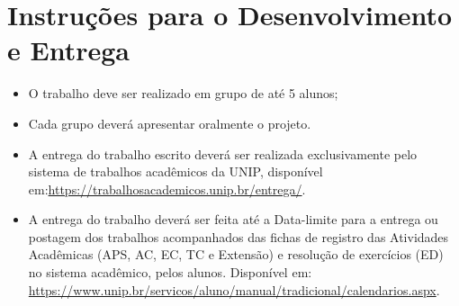 \chapter*{Instruções para o Desenvolvimento e Entrega}
\begin{itemize}
    \item O trabalho deve ser realizado em grupo de até 5 alunos;
    \item Cada grupo deverá apresentar oralmente o projeto.
    \item A entrega do trabalho escrito deverá ser realizada exclusivamente pelo sistema de trabalhos acadêmicos da UNIP, disponível em:\url{https://trabalhosacademicos.unip.br/entrega/}.
	\item A entrega do trabalho deverá ser feita até a Data-limite para a entrega ou postagem dos trabalhos acompanhados das fichas de registro das Atividades Acadêmicas (APS, AC, EC, TC e Extensão) e resolução de exercícios (ED) no sistema acadêmico, pelos alunos. Disponível em: \url{https://www.unip.br/servicos/aluno/manual/tradicional/calendarios.aspx}.
\end{itemize}

